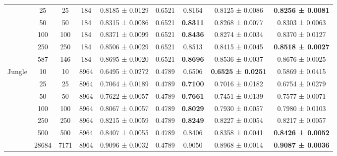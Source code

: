 \begin{table}
{\begin{tabular}[H]{@{}lcccccccc@{}}
                              & 25    & 25   & 184  & 0.8185 ± 0.0129      & 0.6521               & 0.8164          & 0.8125 ± 0.0086          & \textbf{0.8256 ± 0.0081} \\
                              & 50    & 50   & 184  & 0.8315 ± 0.0086      & 0.6521               & \textbf{0.8311} & 0.8268 ± 0.0077          & 0.8303 ± 0.0063          \\
                              & 100   & 100  & 184  & 0.8371 ± 0.0099      & 0.6521               & \textbf{0.8436} & 0.8274 ± 0.0034          & 0.8370 ± 0.0127          \\
                              & 250   & 250  & 184  & 0.8506 ± 0.0029      & 0.6521               & 0.8513          & 0.8415 ± 0.0045          & \textbf{0.8518 ± 0.0027} \\
                              & 587   & 146  & 184  & 0.8695 ± 0.0020      & 0.6521               & \textbf{0.8696} & 0.8536 ± 0.0037          & 0.8676 ± 0.0025          \\
                              \midrule
\multirow{7}{*}{Jungle}       & 10    & 10   & 8964 & 0.6495 ± 0.0272      & 0.4789               & 0.6506          & \textbf{0.6525 ± 0.0251} & 0.5869 ± 0.0415          \\
                              & 25    & 25   & 8964 & 0.7064 ± 0.0189      & 0.4789               & \textbf{0.7100} & 0.7016 ± 0.0182          & 0.6754 ± 0.0279          \\
                              & 50    & 50   & 8964 & 0.7622 ± 0.0057      & 0.4789               & \textbf{0.7661} & 0.7451 ± 0.0139          & 0.7577 ± 0.0071          \\
                              & 100   & 100  & 8964 & 0.8067 ± 0.0057      & 0.4789               & \textbf{0.8029} & 0.7930 ± 0.0057          & 0.7980 ± 0.0103          \\
                              & 250   & 250  & 8964 & 0.8215 ± 0.0059      & 0.4789               & \textbf{0.8249} & 0.8227 ± 0.0054          & 0.8217 ± 0.0057          \\
                              & 500   & 500  & 8964 & 0.8407 ± 0.0055      & 0.4789               & 0.8406          & 0.8358 ± 0.0041          & \textbf{0.8426 ± 0.0052} \\
                              & 28684 & 7171 & 8964 & 0.9096 ± 0.0032      & 0.4789               & 0.9050          & 0.8968 ± 0.0014          & \textbf{0.9087 ± 0.0036} \\
\bottomrule
\end{tabular}}
\end{table}




